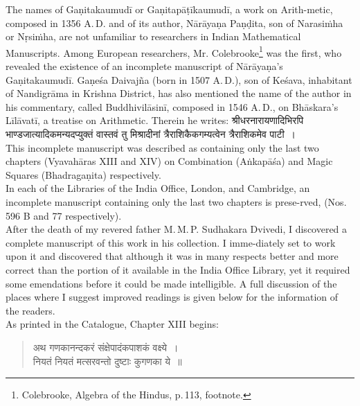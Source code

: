 \documentclass[11pt, openany]{book}
\begin{document}
The names of Gaṇitakaumudī or Gaṇitapāṭīkaumudī, 
a work on Arith-metic, composed in 1356 A.\,D. and of its 
author, Nārāyaṇa Paṇḍita, son of Narasiṁha or Nṛsiṁha, are 
not unfamiliar to researchers in Indian Mathematical Manuscripts. Among European researchers, Mr. Colebrooke\renewcommand{\thefootnote}{1}\footnote{Colebrooke, Algebra of the Hindus, p.\,113, footnote.} was 
the first, who revealed the existence of an incomplete manuscript of Nārāyaṇa's Gaṇitakaumudī. Gaṇeśa Daivajña (born 
in 1507 A.\,D.), son of Keśava, inhabitant of Nandigrāma in 
Krishna District, has also mentioned the name of the author 
in his commentary, called Buddhivilāsinī, composed in 1546 
A.\,D., on Bhāskara's Līlāvatī, a treatise on Arithmetic. Therein 
he writes: {\qt श्रीधरनारायणादिभिरपि भाण्डजात्यादिकमन्यदप्युक्तं वास्तवं
तु 
मिश्रादीनां त्रैराशिकैकगम्यत्वेन त्रैराशिकमेव पाटी~। }\\

\vspace{-2mm}
 This incomplete manuscript was described as containing 
only the last two chapters (Vyavahāras XIII and XIV) on 
Combination (Aṅkapāśa) and Magic Squares (Bhadragaṇita) 
respectively. \\

\vspace{-2mm}
 In each of the Libraries of the India Office, London, and 
Cambridge, an incomplete manuscript containing only the last 
two chapters is prese-rved, (Nos. 596 B and 77 respectively). \\

 \vspace{-2mm}
 After the death of my revered father M.\,M.\,P. Sudhakara 
Dvivedi, I discovered a complete manuscript of this work in his 
collection. I imme-diately set to work upon it and discovered 
that although it was in many respects better and more correct 
than the portion of it available in the India Office Library, 
yet it required some emendations before it could be made 
intelligible. A full discussion of the places where I suggest 
improved readings is given below for the information of the 
readers. \\

\vspace{-2mm}
 As printed in the Catalogue, Chapter XIII begins:\textemdash\ 
\begin{quote}
    \qt 
     अथ गणकानन्दकरं संक्षेपादंकपाशकं वक्ष्ये~। \\
 नियतं नियतं मत्सरवन्तो दुष्टाः कुगणका ये~॥~
\end{quote}
\thispagestyle{empty}
\end{document}
